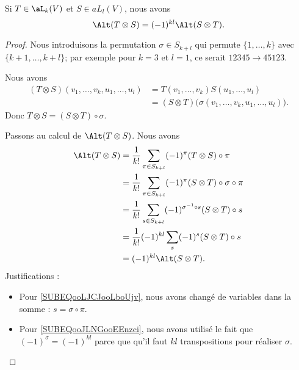 \begin{lemma}		\label{LEMooIMYIooZIxYRp}
	Si \( T\in\aL_k(V)\) et \( S\in aL_l(V)\), nous avons
	\begin{equation}
		\Alt(T\otimes S)=(-1)^{kl}\Alt(S\otimes T).
	\end{equation}
\end{lemma}

\begin{proof}
	Nous introduisons la permutation \( \sigma\in S_{k+l}\) qui permute \( \{ 1,\ldots,k \}\) avec \( \{ k+1,\ldots,k+l \}\); par exemple pour \( k=3\) et \( l=1\), ce serait \( 12345\to 45123\).

	Nous avons
	\begin{subequations}
		\begin{align}
			(T\otimes S)(v_1,\ldots,v_k,u_1,\ldots,u_l) & =T(v_1,\ldots,v_k)S(u_1,\ldots, u_l)                            \\
			                                            & =(S\otimes T)\big( \sigma(v_1,\ldots,v_k,u_1,\ldots,u_l) \big).
		\end{align}
	\end{subequations}
	Donc \( T\otimes S=(S\otimes T)\circ \sigma\).

	Passons au calcul de \( \Alt(T\otimes S)\). Nous avons
	\begin{subequations}
		\begin{align}
			\Alt(T\otimes S) & =\frac{1}{ k!}\sum_{\pi\in S_{k+l}}(-1)^{\pi}(T\otimes S)\circ\pi                                        \\
			                 & = \frac{1}{ k!}\sum_{\pi\in S_{k+l}}(-1)^{\pi}(S\otimes T)\circ\sigma\circ\pi                            \\
			                 & =\frac{1}{ k!}\sum_{s\in S_{k+l}}(-1)^{\sigma^{-1}\circ s}(S\otimes T)\circ s		\label{SUBEQooLJCJooLboUjv} \\
			                 & =\frac{1}{ k!}(-1)^{kl}\sum_s(-1)^{s}(S\otimes T)\circ s			\label{SUBEQooJLNGooEEnzci}                      \\
			                 & =(-1)^{kl}\Alt(S\otimes T).
		\end{align}
	\end{subequations}
	Justifications :
	\begin{itemize}
		\item
		      Pour \eqref{SUBEQooLJCJooLboUjv}, nous avons changé de variables dans la somme : \( s=\sigma\circ \pi\).
		\item
		      Pour \eqref{SUBEQooJLNGooEEnzci}, nous avons utilisé le fait que \( (-1)^{\sigma}=(-1)^{kl}\) parce que qu'il faut \( kl\) transpositions pour réaliser \( \sigma\).
	\end{itemize}

\end{proof}

